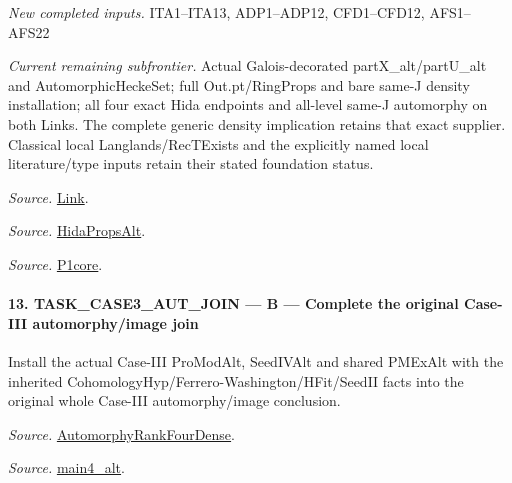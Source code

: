 \emph{New completed inputs.} ITA1–ITA13, ADP1–ADP12, CFD1–CFD12, AFS1–AFS22

\emph{Current remaining subfrontier.} Actual Galois-decorated partX\_\allowbreak alt/partU\_\allowbreak alt and AutomorphicHeckeSet; full Out.pt/RingProps and bare same-J density installation; all four exact Hida endpoints and all-level same-J automorphy on both Links. The complete generic density implication retains that exact supplier. Classical local Langlands/RecTExists and the explicitly named local literature/type inputs retain their stated foundation status.

\emph{Source.} \href{https://github.com/CocoSgt/riemann-hypothesis-lean/blob/7cbf7a0c32fca1badf05931879a37c3f8a2b03b4/src/Development/AutomorphicArithmetic/AutomorphicVarieties/WeakShimuraTheory/IsAlgClosureField.lean#L19-L52}{Link}.

\emph{Source.} \href{https://github.com/CocoSgt/riemann-hypothesis-lean/blob/7cbf7a0c32fca1badf05931879a37c3f8a2b03b4/src/Development/AutomorphicArithmetic/AutomorphicVarieties/ModularityArgument/ThresholdArguments/DenseThresholdCases/PointTheoremBaseObject.lean#L32-L38}{HidaPropsAlt}.

\emph{Source.} \href{https://github.com/CocoSgt/riemann-hypothesis-lean/blob/7cbf7a0c32fca1badf05931879a37c3f8a2b03b4/src/Development/AutomorphicArithmetic/AutomorphicVarieties/WeilGroupCharacters/UniversalOrdinaryDeterminantRing.lean#L284-L286}{P1core}.



\paragraph{13. TASK\_\allowbreak CASE3\_\allowbreak AUT\_\allowbreak JOIN — B — Complete the original Case-III automorphy/image join}

Install the actual Case-III ProModAlt, SeedIVAlt and shared PMExAlt with the inherited CohomologyHyp/Ferrero-Washington/HFit/SeedII facts into the original whole Case-III automorphy/image conclusion.

\emph{Source.} \href{https://github.com/CocoSgt/riemann-hypothesis-lean/blob/7cbf7a0c32fca1badf05931879a37c3f8a2b03b4/src/Development/AutomorphicArithmetic/AutomorphicVarieties/ModularityArgument/ThresholdArguments/DenseThresholdCases/PromodularityCaseThree.lean#L43-L44}{AutomorphyRankFourDense}.

\emph{Source.} \href{https://github.com/CocoSgt/riemann-hypothesis-lean/blob/7cbf7a0c32fca1badf05931879a37c3f8a2b03b4/src/Development/AutomorphicArithmetic/AutomorphicVarieties/ModularityArgument/ThresholdArguments/DenseThresholdCases/CuFinal.lean#L44-L44}{main4\_\allowbreak alt}.



